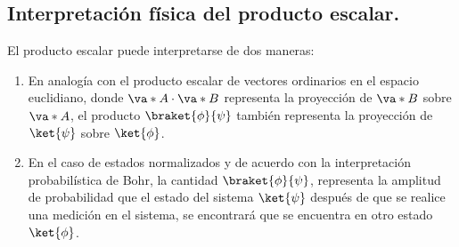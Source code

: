 \subsection*{Interpretación física del producto escalar.}
El producto escalar puede interpretarse de dos maneras:
\begin{enumerate}[label=\arabic*)]
\item En analogía con el producto escalar de vectores ordinarios en el espacio euclidiano, donde $\va*{A} \cdot \va*{B}$ representa la proyección de $\va*{B}$ sobre $\va*{A}$, el producto $\braket{\phi}{\psi}$ también representa la proyección de $\ket{\psi}$ sobre $\ket{\phi}$.
\item En el caso de estados normalizados y de acuerdo con la interpretación probabilística de Bohr, la cantidad $\braket{\phi}{\psi}$, representa la amplitud de probabilidad que el estado del sistema $\ket{\psi}$ después de que se realice una medición en el sistema, se encontrará que se encuentra en otro estado $\ket{\phi}$.
\end{enumerate}
